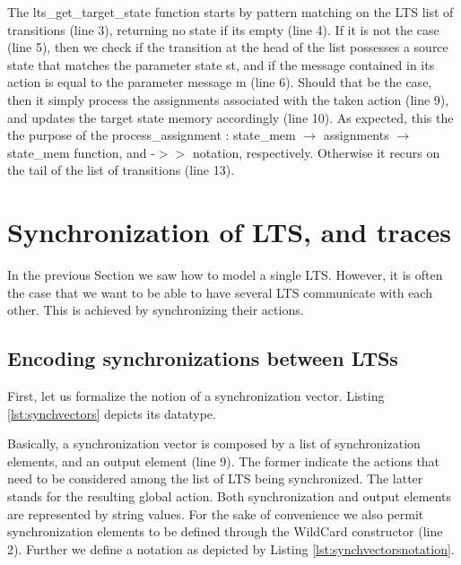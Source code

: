 	The \textsf{lts\_get\_target\_state} function starts by pattern matching on the \textsf{LTS}
	list of \textsf{transitions} (line 3),  returning no state if its empty (line 4). If it is not the 
	case (line 5), then we check if the \textsf{transition} at the head of the list possesses
	a source state that matches the parameter state \textsf{st}, and if the \textsf{message} contained
	in its \textsf{action} is equal to the parameter \textsf{message m} (line 6). Should that be the case,
	then it simply process the assignments associated with the taken \textsf{action} (line 9), and updates
	the target state memory accordingly (line 10). As expected, this the the purpose of the
	\textsf{process\_assignment : state\_mem $\rightarrow$ assignments $\rightarrow$ state\_mem} function, 
	and \textsf{-$>>$} notation, respectively. Otherwise it recurs on the tail of the list of 
	\textsf{transitions} (line 13).


\section{Synchronization of LTS, and traces}
\label{sec:pnet}


	In the previous Section we saw how to model a single \ac{LTS}. However, it is often the case
	that we want to be able to have several \ac{LTS} communicate with each other.	This is achieved
	by synchronizing their \textsf{actions}.


\subsection{Encoding synchronizations between LTSs}	
\label{sub:synchencode}	
	
	
		First, let us formalize the notion of a synchronization vector. Listing \ref{lst:synchvectors}
	depicts its datatype.	
	
			

	\noindent Basically, a synchronization vector is composed by a list of synchronization elements,
	and an output element (line 9). The former indicate the \textsf{actions} that need to be considered among
	the list of \ac{LTS} being synchronized. The latter stands for the resulting global action.  
	Both synchronization and output elements are represented by string values. For the sake of convenience
	we also permit synchronization elements to be defined through the \textsf{WildCard} constructor (line 2).
	Further we define a notation as depicted by Listing \ref{lst:synchvectorsnotation}.
	
